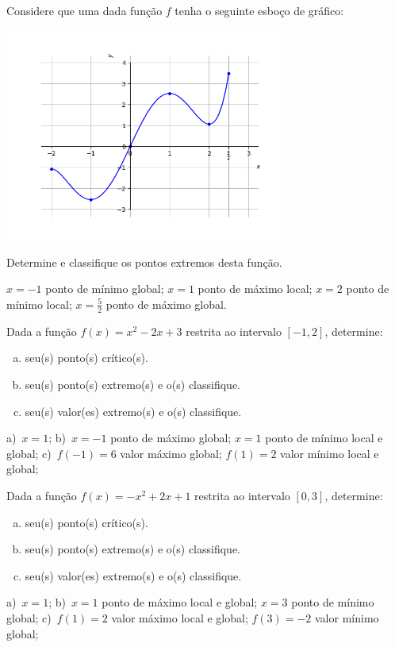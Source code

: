 \cleardoublepage\documentclass[../main.tex]{subfiles}
\begin{document}
\begin{exer}
  Considere que uma dada função $f$ tenha o seguinte esboço de gráfico:

  \begin{center}
    \includegraphics[width=0.7\textwidth]{./fig_apl_deriv/fig_exer_extfun}
  \end{center}

  Determine e classifique os pontos extremos desta função.
\end{exer}
\begin{resp}
  $x=-1$ ponto de mínimo global; $x=1$ ponto de máximo local; $x=2$ ponto de mínimo local; $x=\frac{5}{2}$ ponto de máximo global.
\end{resp}

\begin{exer}
  Dada a função $f(x)=x^2-2x+3$ restrita ao intervalo $[-1,2]$, determine:
  \begin{enumerate}[a)]
  \item seu(s) ponto(s) crítico(s).
  \item seu(s) ponto(s) extremo(s) e o(s) classifique.
  \item seu(s) valor(es) extremo(s) e o(s) classifique.
  \end{enumerate}
\end{exer}
\begin{resp}
  a)~$x=1$; b)~$x=-1$ ponto de máximo global; $x=1$ ponto de mínimo local e global; c)~$f(-1)=6$ valor máximo global; $f(1)=2$ valor mínimo local e global;
\end{resp}

\begin{exer}
  Dada a função $f(x)=-x^2+2x+1$ restrita ao intervalo $[0,3]$, determine:
  \begin{enumerate}[a)]
  \item seu(s) ponto(s) crítico(s).
  \item seu(s) ponto(s) extremo(s) e o(s) classifique.
  \item seu(s) valor(es) extremo(s) e o(s) classifique.
  \end{enumerate}
\end{exer}
\begin{resp}
  a)~$x=1$; b)~$x=1$ ponto de máximo local e global; $x=3$ ponto de mínimo global; c)~$f(1)=2$ valor máximo local e global; $f(3)=-2$ valor mínimo global;
\end{resp}
\end{document}
